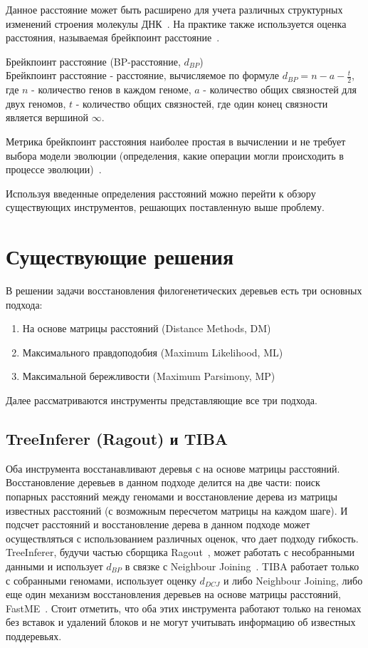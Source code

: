 Данное расстояние может быть расширено для учета различных структурных изменений строения молекулы ДНК~\cite{yancopoulos2009dcj}.
На практике также используется оценка расстояния, называемая брейкпоинт расстояние~\cite{blanchette1997breakpoint}.

\begin{define}{Брейкпоинт расстояние (BP-расстояние, $d_{BP}$)} \\
  Брейкпоинт расстояние - расстояние, вычисляемое по формуле $d_{BP} = n - a - \frac{t}{2}$,
  где $n$ - количество генов в каждом геноме,
  $a$ - количество общих связностей для двух геномов, $t$ - количество
  общих связностей, где один конец связности является вершиной $\infty$.
\end{define}
Метрика брейкпоинт расстояния наиболее простая в вычислении и не требует выбора модели эволюции
(определения, какие операции могли происходить в процессе эволюции)~\cite{blanchette1997breakpoint}.

Используя введенные определения расстояний можно перейти к обзору существующих инструментов,
решающих поставленную выше проблему.

\section{Существующие решения}

В решении задачи восстановления филогенетических деревьев есть три основных подхода:
\begin{enumerate}
  \item На основе матрицы расстояний (Distance Methods, DM)
  \item Максимального правдоподобия (Maximum Likelihood, ML)
  \item Максимальной бережливости (Maximum Parsimony, MP)
\end{enumerate}

Далее рассматриваются инструменты представляющие все три подхода.

\subsection{TreeInferer (Ragout) и TIBA~\cite{lin2012tiba}}
Оба инструмента восстанавливают деревья с на основе матрицы расстояний.
Восстановление деревьев в данном подходе делится на две части:
поиск попарных расстояний между геномами и восстановление дерева из матрицы известных расстояний
(с возможным пересчетом матрицы на каждом шаге).
И подсчет расстояний и восстановление дерева в данном подходе может осуществляться с использованием различных оценок, что дает подходу гибкость.
TreeInferer, будучи частью сборщика Ragout~\cite{Kolmogorov2014}, может работать с несобранными данными
и использует $d_{BP}$ в связке с Neighbour Joining~\cite{saitou1987neighbor}.
TIBA работает только с собранными геномами, использует оценку $d_{DCJ}$
и либо Neighbour Joining, либо еще один механизм восстановления деревьев на основе матрицы расстояний, FastME~\cite{desper2002fast}.
Стоит отметить, что оба этих инструмента работают только на геномах без вставок и удалений блоков
и не могут учитывать информацию об известных поддеревьях.

